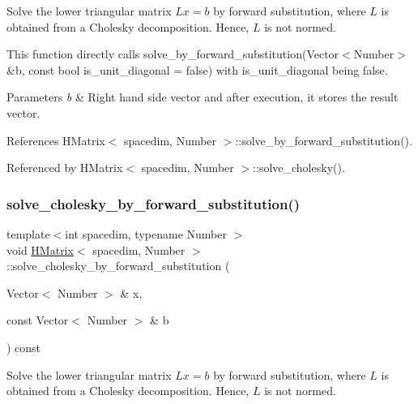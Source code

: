 Solve the lower triangular matrix $Lx=b$ by forward substitution, where $L$ is obtained from a Cholesky decomposition. Hence, $L$ is not normed.

This function directly calls {\ttfamily solve\+\_\+by\+\_\+forward\+\_\+substitution}(Vector$<$\+Number$>$ \&b, const bool is\+\_\+unit\+\_\+diagonal = false) with {\ttfamily is\+\_\+unit\+\_\+diagonal} being {\ttfamily false}.


\begin{DoxyParams}{Parameters}
{\em b} & Right hand side vector and after execution, it stores the result vector. \\
\hline
\end{DoxyParams}


References H\+Matrix$<$ spacedim, Number $>$\+::solve\+\_\+by\+\_\+forward\+\_\+substitution().



Referenced by H\+Matrix$<$ spacedim, Number $>$\+::solve\+\_\+cholesky().

\mbox{\label{classHMatrix_a59d32edbfaac9221dc5e219640c3ecd3}} 
\subsubsection{\texorpdfstring{solve\+\_\+cholesky\+\_\+by\+\_\+forward\+\_\+substitution()}{solve\_cholesky\_by\_forward\_substitution()}\hspace{0.1cm}{\footnotesize\ttfamily [2/4]}}
{\footnotesize\ttfamily template$<$int spacedim, typename Number $>$ \\
void \hyperlink{classHMatrix}{H\+Matrix}$<$ spacedim, Number $>$\+::solve\+\_\+cholesky\+\_\+by\+\_\+forward\+\_\+substitution (\begin{DoxyParamCaption}\item[{Vector$<$ Number $>$ \&}]{x,  }\item[{const Vector$<$ Number $>$ \&}]{b }\end{DoxyParamCaption}) const}

Solve the lower triangular matrix $Lx=b$ by forward substitution, where $L$ is obtained from a Cholesky decomposition. Hence, $L$ is not normed.

